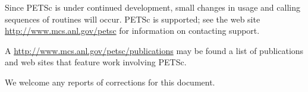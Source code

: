 Since PETSc is under continued development, small changes in usage and
calling sequences of routines will occur.  PETSc is supported; see the
web site \href{http://www.mcs.anl.gov/petsc}{http://www.mcs.anl.gov/petsc} for information on
contacting support.

A \href{http://www.mcs.anl.gov/petsc/publications}{http://www.mcs.anl.gov/petsc/publications} may be found
a list of publications and web sites that feature work involving PETSc.


We welcome any reports of corrections for this document.

\medskip \medskip



